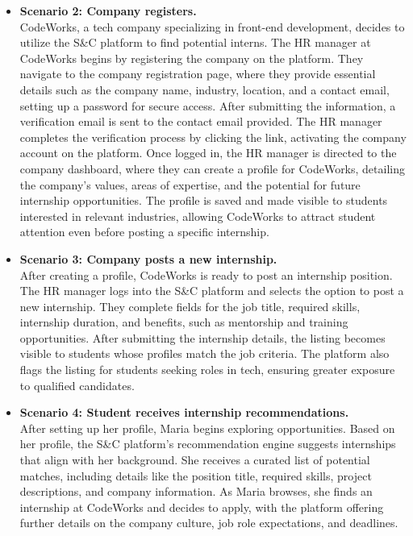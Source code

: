 \begin{itemize}
    \item \textbf{Scenario 2: Company registers.} \\
    CodeWorks, a tech company specializing in front-end development, decides to utilize the S\&C platform to find potential interns. The HR manager at CodeWorks begins by registering the company on the platform. They navigate to the company registration page, where they provide essential details such as the company name, industry, location, and a contact email, setting up a password for secure access. After submitting the information, a verification email is sent to the contact email provided. The HR manager completes the verification process by clicking the link, activating the company account on the platform. Once logged in, the HR manager is directed to the company dashboard, where they can create a profile for CodeWorks, detailing the company's values, areas of expertise, and the potential for future internship opportunities. The profile is saved and made visible to students interested in relevant industries, allowing CodeWorks to attract student attention even before posting a specific internship.

    \item \textbf{Scenario 3: Company posts a new internship.} \\
    After creating a profile, CodeWorks is ready to post an internship position. The HR manager logs into the S\&C platform and selects the option to post a new internship. They complete fields for the job title, required skills, internship duration, and benefits, such as mentorship and training opportunities. After submitting the internship details, the listing becomes visible to students whose profiles match the job criteria. The platform also flags the listing for students seeking roles in tech, ensuring greater exposure to qualified candidates. 

    \item \textbf{Scenario 4: Student receives internship recommendations.}  \\
    After setting up her profile, Maria begins exploring opportunities. Based on her profile, the S\&C platform’s recommendation engine suggests internships that align with her background. She receives a curated list of potential matches, including details like the position title, required skills, project descriptions, and company information. As Maria browses, she finds an internship at CodeWorks and decides to apply, with the platform offering further details on the company culture, job role expectations, and deadlines.
    

\end{itemize}
